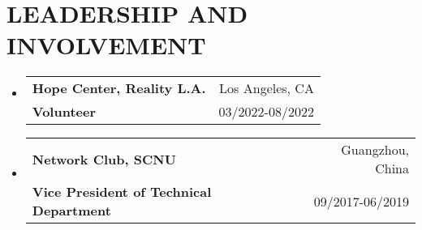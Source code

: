 \documentclass[letterpaper,11pt]{article}
\makeatletter
\newcommand{\resumeSubheading}[4]{
  \vspace{-1pt}\item
    \begin{tabular*}{0.97\textwidth}[t]{l@{\extracolsep{\fill}}r}
      \textbf{#1} & #2 \\
      \textbf{\small#3} & \small{#4} \\
    \end{tabular*}\vspace{-10pt}
}
\newcommand{\resumeSubHeadingListStart}{\begin{itemize}[leftmargin=*]}
\newcommand{\resumeSubHeadingListEnd}{\end{itemize}\vspace{-5pt}}
\makeatother
\begin{document}
\section{LEADERSHIP AND INVOLVEMENT}
\resumeSubHeadingListStart
\resumeSubheading
    {Hope Center, Reality L.A.}{Los Angeles, CA}
    {Volunteer}{03/2022-08/2022}
\resumeSubheading
    {Network Club, SCNU}{Guangzhou, China}
    {Vice President of Technical Department}{09/2017-06/2019}
\resumeSubHeadingListEnd
\end{document}
